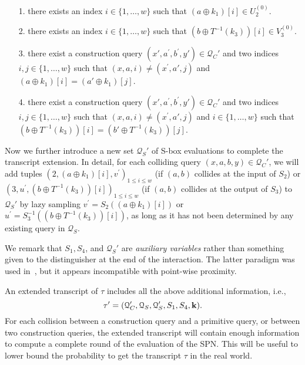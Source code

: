 \documentclass[journal=tosc,final,nohyperref]{iacrtrans}
\begin{document}
\begin{itemize}
	\item[1.] there exists an index $i \in\{1, \ldots, w\}$ such that $\left(a \oplus k_1\right)[i]\in U_2^{(0)}$.
	\item[2.] there exists an index $i \in\{1, \ldots, w\}$ such that $\left(b \oplus T^{-1}(k_3)\right)[i]\in V_3^{(0)}$.
	\item[3.] there exist a construction query $\left(x',a^{\prime}, b^{\prime},y'\right) \in \mathcal{Q}_{C}'$ and two indices $i,j \in\{1, \ldots, w\}$ such that $(x, a,i) \neq\left(x^{\prime},a', j\right)$ and $\left(a \oplus k_1\right)[i] = \left(a' \oplus k_1\right)[j]$.
	\item[4.] there exist a construction query $\left(x',a^{\prime}, b^{\prime},y'\right) \in \mathcal{Q}_{C}'$ and two indices $i,j \in\{1, \ldots, w\}$ such that $(x,a, i) \neq\left(x^{\prime},a', j\right)$ and $i \in\{1, \ldots, w\}$ such that $\left(b \oplus T^{-1}(k_3)\right)[i] = \left(b' \oplus T^{-1}(k_3)\right)[j]$.
\end{itemize}
%
%
Now we further introduce a new set $\mathcal{Q}_{S}'$ of S-box evaluations to complete the transcript extension. In detail, for each colliding query $(x,a,b,y)\in\mathcal{Q}_C'$, we will add tuples $\left(2, (a \oplus k_1)[i], v^{\prime}\right)_{1 \leq i \leq w}$ (if $(a, b)$ collides at the input of $S_2$) or $\left(3, u^{\prime}, (b \oplus T^{-1}(k_3))[i]\right)_{1 \leq i \leq w}$ (if $(a, b)$ collides at the output of $S_3$) to $\mathcal{Q}_{S}'$ by lazy sampling $v^{\prime}=S_2((a \oplus k_1)[i])$ or $u^{\prime}=S_3^{-1}((b \oplus T^{-1}(k_3))[i])$, as long as it has not been determined by any existing query in $\mathcal{Q}_S$.


We remark that $S_1,S_4$, and $\mathcal{Q}_{S}'$ are {\it auxiliary variables} rather than something given to the distinguisher at the end of the interaction. The latter paradigm was used in~\cite{EC:CheSte14}, but it appears incompatible with point-wise proximity.



An extended transcript of $\tau$ includes all the above additional information, i.e.,
%
$$\tau'=(\mathcal{Q}_{C}',\mathcal{Q}_{S},\mathcal{Q}_{S}',S_1,S_4,\mathbf{k}).$$
%
For each collision between a construction query and a primitive query, or between two construction queries, the extended transcript will contain enough information to compute a complete round of the evaluation of the SPN. This will be useful to lower bound the probability to get the transcript $\tau$ in the real world.
\end{document}
